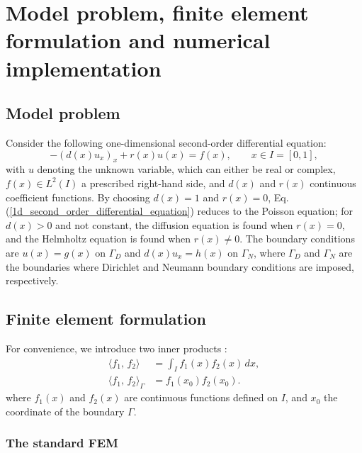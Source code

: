\documentclass[review,3p]{elsarticle}
\begin{document}
\section{Model problem, finite element formulation and numerical implementation}	\label{section_model_problem_FEM_formulation_numerical_implementation}

\subsection{Model problem}

Consider the following one-dimensional second-order differential equation:
\begin{equation}
  -\left(d(x) u_x \right)_x + r(x)u(x) = f(x),\qquad x \in I = [0,1],	\label{1d_second_order_differential_equation}
\end{equation}
with $u$ denoting the unknown variable, which can either be real or complex, $f(x) \in L^2 (I)$ a prescribed right-hand side, and $d(x)$ and $r(x)$ continuous coefficient functions.
By choosing $d(x)=1$ and $r(x)=0$, Eq. (\ref{1d_second_order_differential_equation}) reduces to the Poisson equation; for $d(x)>0$ and not constant, the diffusion equation is found when $r(x)=0$, and the Helmholtz equation \citep{haberman2012applied} is found when $r(x) \neq 0$. 
The boundary conditions are $u(x)=g(x)$ on $\Gamma_D$ and $d(x)u_x=h(x)$ on $\Gamma_N$, where $\Gamma_D$ and $\Gamma_N$ are the boundaries where Dirichlet and Neumann boundary conditions are imposed, respectively.

\subsection{Finite element formulation} 	\label{FE formulation}

For convenience, we introduce two inner products \citep{lipschutz2009linear}:
 \begin{subequations}
  \begin{align}
	\langle f_1, \,f_2 \rangle &= \int _I f_1(x) f_2(x) \, dx,	\\
   \langle f_1, \,f_2 \rangle _{\Gamma} &= f_1(x_0) f_2(x_0).
  \end{align}
 \end{subequations}
where $f_1(x)$ and $f_2(x)$ are continuous functions defined on $I$, and $x_0$ the coordinate of the boundary $\Gamma$.

\subsubsection{The standard FEM}
\end{document}

